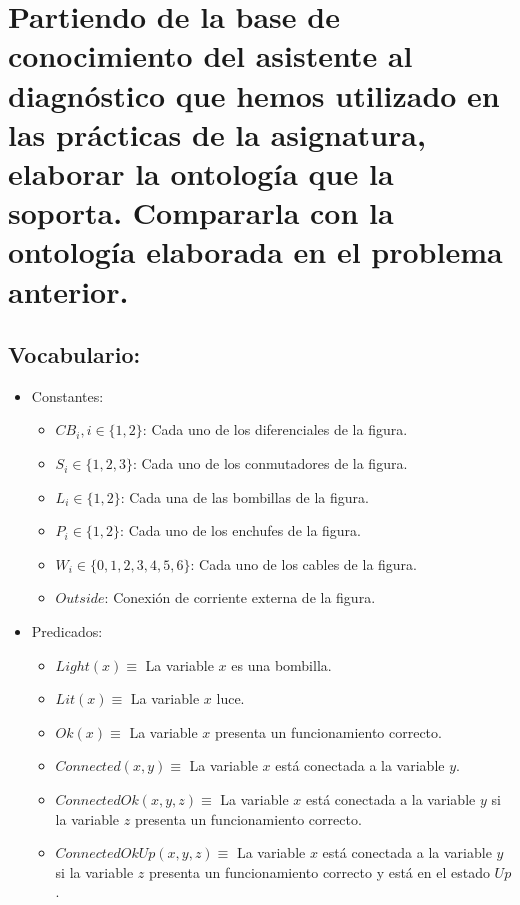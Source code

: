 \documentclass[10pt, a4paper,spanish]{article}
\begin{document}
	\clearpage
	\section{Partiendo de la base de conocimiento del asistente al diagnóstico que hemos utilizado en las prácticas de la asignatura, elaborar la ontología que la soporta. Compararla con la ontología elaborada en el problema anterior.}

		\paragraph{}

		\subsection{Vocabulario:}
			\begin{itemize}
				\item Constantes:
				\begin{itemize}
					\item $CB_i, i \in \{1,2\}$: Cada uno de los diferenciales de la figura.
					\item $S_i \in \{1,2,3\}$:  Cada uno de los conmutadores de la figura.
					\item $L_i \in \{1,2\}$: Cada una de las bombillas de la figura.
					\item $P_i \in \{1,2\}$: Cada uno de los enchufes de la figura.
					\item $W_i \in \{0,1,2,3,4,5,6\}$: Cada uno de los cables de la figura.
					\item $Outside$: Conexión de corriente externa de la figura.
				\end{itemize}
				\item Predicados:
				\begin{itemize}
					\item $Light(x) \equiv$ La variable $x$ es una bombilla.
					\item $Lit(x) \equiv$ La variable $x$ luce.
					\item $Ok(x) \equiv$ La variable $x$ presenta un funcionamiento correcto.
					\item $Connected(x, y) \equiv$ La variable $x$ está conectada a la variable $y$.
					\item $ConnectedOk(x, y, z) \equiv$ La variable $x$ está conectada a la variable $y$ si la variable $z$ presenta un funcionamiento correcto.
					\item $ConnectedOkUp(x, y, z) \equiv$ La variable $x$ está conectada a la variable $y$ si la variable $z$ presenta un funcionamiento correcto y está en el estado $Up$.

\end{itemize}
\end{itemize}
\end{document}
